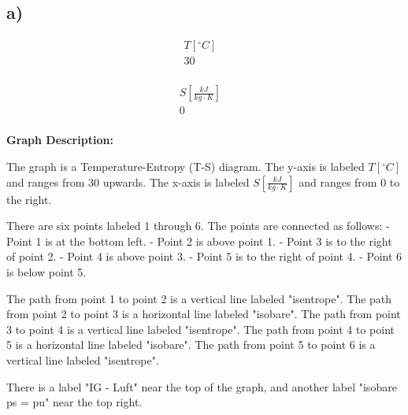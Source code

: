 

\subsection*{a)}

\[
\begin{array}{c|c}
T [^\circ C] & \\
\hline
30 & \\
\end{array}
\]

\[
\begin{array}{c|c}
S \left[ \frac{kJ}{kg \cdot K} \right] & \\
\hline
0 & \\
\end{array}
\]

\textbf{Graph Description:}

The graph is a Temperature-Entropy (T-S) diagram. The y-axis is labeled \( T [^\circ C] \) and ranges from 30 upwards. The x-axis is labeled \( S \left[ \frac{kJ}{kg \cdot K} \right] \) and ranges from 0 to the right. 

There are six points labeled 1 through 6. The points are connected as follows:
- Point 1 is at the bottom left.
- Point 2 is above point 1.
- Point 3 is to the right of point 2.
- Point 4 is above point 3.
- Point 5 is to the right of point 4.
- Point 6 is below point 5.

The path from point 1 to point 2 is a vertical line labeled "isentrope". The path from point 2 to point 3 is a horizontal line labeled "isobare". The path from point 3 to point 4 is a vertical line labeled "isentrope". The path from point 4 to point 5 is a horizontal line labeled "isobare". The path from point 5 to point 6 is a vertical line labeled "isentrope".

There is a label "IG - Luft" near the top of the graph, and another label "isobare ps = pu" near the top right.